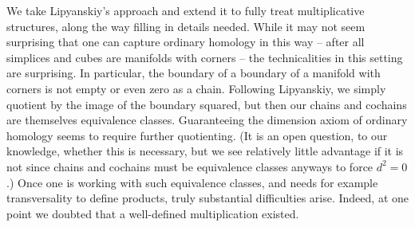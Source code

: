 We take Lipyanskiy's approach and extend it to fully treat multiplicative structures, along the way filling in details needed.
While it may not seem surprising that one can capture ordinary homology in this way -- after all simplices and cubes are manifolds with corners -- the technicalities in this setting are surprising.
In particular, the boundary of a boundary of a manifold with corners is not empty or even zero as a chain.
Following Lipyanskiy, we simply quotient by the image of the boundary squared, but then our chains and cochains are themselves equivalence classes.
Guaranteeing the dimension axiom of ordinary homology seems to require further quotienting.
(It is an open question, to our knowledge, whether this is necessary, but we see relatively little advantage if it is not since chains and cochains must be equivalence classes anyways to force $d^2 = 0$.)
Once one is working with such equivalence classes, and needs for example transversality to define products, truly substantial difficulties arise.
Indeed, at one point we doubted that a well-defined multiplication existed.

